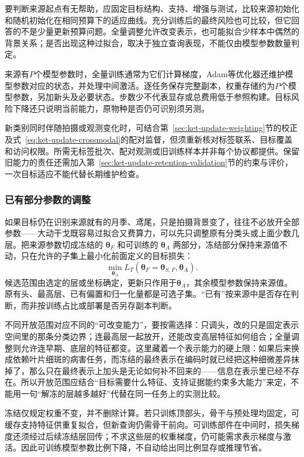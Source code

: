 要判断来源起点有无帮助，应固定目标结构、支持、增强与测试，比较来源初始化和随机初始化在相同预算下的适应曲线。充分训练后的最终风险也可比较，但它回答的不是少量更新预算问题。全量调整允许改变表示，也可能拟合少样本中偶然的背景关系；是否出现这种过拟合，取决于独立查询表现，不能仅由模型参数数量判定。

来源有$P$个模型参数时，全量训练通常为它们计算梯度，Adam等优化器还维护模型参数对应的状态，并处理中间激活。逐任务保存完整副本，权重存储约为$P$个模型参数，另加新头及必要状态。步数少不代表显存或总费用低于参照构建。目标风险下降还只说明当前能力，原物种是否仍可识别须另测。

新类别同时伴随拍摄或观测变化时，可结合第~\ref{sec:ket-update-weighting}节的校正及式~\eqref{eq:ket-update-crossmodal}的配对监督，但须重新核对标签联系、目标覆盖和访问权限。所需无标签批次、配对观测或旧训练样本并非每个协议都提供。保留旧能力的责任还需加入第~\ref{sec:ket-update-retention-validation}节的约束与评价，一次目标适应不能代替长期维护检查。

\subsubsection{已有部分参数的调整}
\label{sec:ket-transfer-existing-parameters}

如果目标仍在识别来源就有的月季、鸢尾，只是拍摄背景变了，往往不必放开全部参数——大动干戈既容易过拟合又费算力，可以先只调整原有分类头或上面少数几层。把来源参数切成冻结的 $\bm\theta_F$ 和可训练的 $\bm\theta_A$ 两部分，冻结部分保持来源值不动，只在允许的子集上最小化前面定义的目标损失：
\[
  \min_{\bm{\theta}_A}
  L_T(\bm{\theta}_F=\bm{\theta}_{S,F},\bm{\theta}_A).
\]
候选范围由选定的层或坐标确定，更新只作用于$\bm\theta_A$，其余模型参数保持来源值。原有头、最高层、已有偏置和归一化量都是可选子集。“已有”按来源中是否存在判断，而非按训练占比或部署是否另存副本判断。

不同开放范围对应不同的“可改变能力”，要按需选择：只调头，改的只是固定表示空间里的那条分类边界；连最高层一起放开，还能改变高层特征如何组合；全量调整则允许连早期、底层的特征都变。这里藏着一个表示能力的硬上限：如果后来换成依赖叶片细斑的病害任务，而冻结的最终表示在编码时就已经把这种细微差异抹掉了，那么只在最终表示上加头是无论如何补不回来的——信息在表示里已经不存在。所以开放范围应结合“目标需要什么特征、支持证据能约束多大能力”来定，不能用一句“解冻的层越多越好”代替在同一任务上的实测比较。

冻结仅规定权重不变，并不删除计算。若只训练顶部头，骨干与预处理均固定，可缓存支持特征供重复拟合，但新查询仍需骨干前向。可训练部件在中间时，损失梯度还须经过后续冻结层回传；不求这些层的权重梯度，仍可能需求表示梯度与激活。因此可训练模型参数比例下降，不自动给出同比例显存或推理节省。

